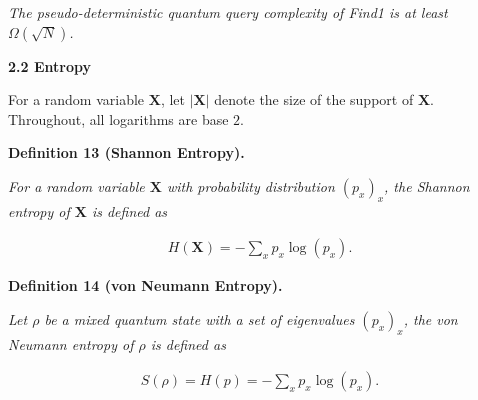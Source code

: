 \emph{The pseudo-deterministic quantum query complexity of Find1 is at least $\Omega(\sqrt{N})$.}\par







\par\medskip\noindent\textbf{
2.2 Entropy}\par




For a random variable $\mathbf{X}$, let $|\mathbf{X}|$ denote the size of the support of $\mathbf{X}$. Throughout, all logarithms are base $2$.\par





\par\medskip\noindent\textbf{
\textbf{Definition 13}\textbf{ }(Shannon Entropy)\textbf{.}
}\par



\emph{For a random variable $\mathbf{X}$ with probability distribution $(p_{x})_{x}$, the Shannon entropy of $\mathbf{X}$ is defined as}\par


\[\begin{gathered}
H(\mathbf{X})=-\sum_{x}p_{x}\log(p_{x}).
\end{gathered}\]







\par\medskip\noindent\textbf{
\textbf{Definition 14}\textbf{ }(von Neumann Entropy)\textbf{.}
}\par



\emph{Let $\rho$ be a mixed quantum state with a set of eigenvalues $(p_{x})_{x}$, the von Neumann entropy of $\rho$ is defined as}\par


\[\begin{gathered}
S(\rho)=H(p)=-\sum_{x}p_{x}\log(p_{x}).
\end{gathered}\]







